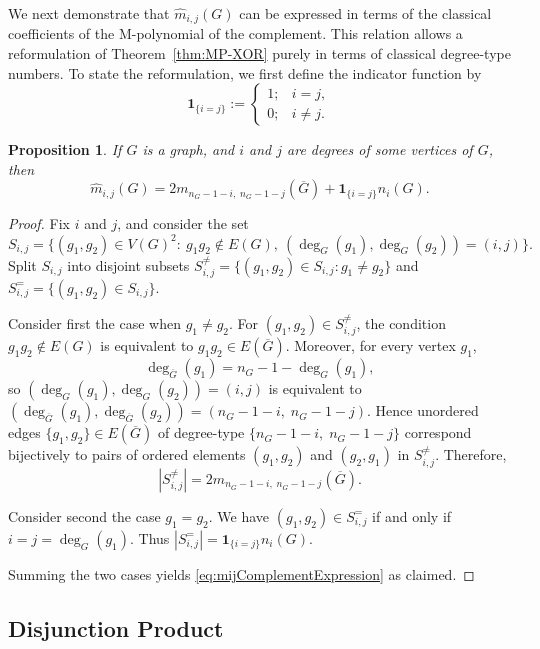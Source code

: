 \documentclass[letterpaper,12pt]{article}
\newtheorem{proposition}[theorem]{Proposition}
\begin{document}
We next demonstrate that  $\widehat m_{i,j}(G)$ can be expressed in terms of the classical coefficients of the M-polynomial of the complement. This relation allows a reformulation of Theorem~\ref{thm:MP-XOR} purely in terms of classical degree-type numbers. To state the reformulation, we first define the indicator function by
\[
\mathbf{1}_{\{i=j\}} :=
\begin{cases}
1; & i=j,\\
0; & i\neq j.
\end{cases}
\]

\begin{proposition}
\label{prop:ordered-nonedges-complement}
If $G$ is a graph, and $i$ and $j$ are degrees of some vertices of $G$, then
\begin{equation}\label{eq:mijComplementExpression}
    \widehat m_{i,j}(G)
=
2 m_{ n_G-1-i,\;n_G-1-j}(\overline G)
+\mathbf 1_{\{i=j\}} n_i(G).
\end{equation}
\end{proposition}

\begin{proof}
Fix $i$ and $j$,  and consider the set
\[
S_{i,j}=\{(g_1,g_2)\in V(G)^2:\ g_1g_2\notin E(G),\ (\deg_G(g_1),\deg_G(g_2))=(i,j)\}.
\]
Split $S_{i,j}$ into disjoint subsets $S_{i,j}^{\neq}=\{(g_1,g_2)\in S_{i,j}: g_1\neq g_2\}$ and $S_{i,j}^{=}=\{(g_1,g_2)\in S_{i,j}\}$.

Consider first the case when $g_1\neq g_2$. For $(g_1,g_2)\in S_{i,j}^{\neq}$, the condition $g_1g_2\notin E(G)$ is equivalent to
$g_1g_2\in E(\overline G)$. Moreover, for every vertex $g_1$,
\[
\deg_{\overline G}(g_1)=n_G-1-\deg_G(g_1),
\]
so $(\deg_G(g_1),\deg_G(g_2))=(i,j)$ is equivalent to
$(\deg_{\overline G}(g_1),\deg_{\overline G}(g_2))=(n_G-1-i,\;n_G-1-j)$.
Hence unordered edges $\{g_1,g_2\}\in E(\overline G)$ of degree-type
$\{n_G-1-i,\;n_G-1-j\}$ correspond bijectively to pairs of ordered
elements $(g_1,g_2)$ and $(g_2,g_1)$ in $S_{i,j}^{\neq}$. Therefore,
\[
|S_{i,j}^{\neq}|=2 m_{ n_G-1-i,\;n_G-1-j}(\overline G).
\]

Consider second the case $g_1=g_2$. We have $(g_1,g_2)\in S_{i,j}^{=}$ if and only if $i=j=\deg_G(g_1)$.
Thus $|S_{i,j}^{=}|=\mathbf 1_{\{i=j\}} n_i(G)$.
 
Summing the two cases yields \eqref{eq:mijComplementExpression} as claimed.
\end{proof}

\subsection{Disjunction Product}
 \label{sec:Disjunction}
\end{document}
